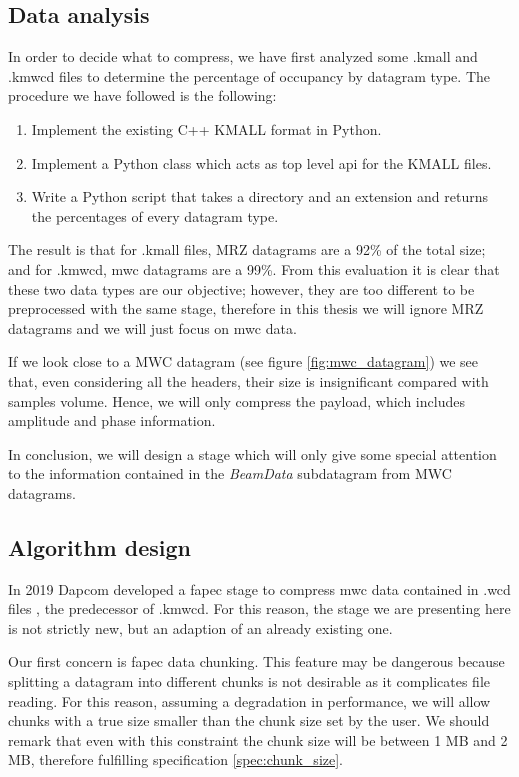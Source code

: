 \subsection{Data analysis}
In order to decide what to compress, we have first analyzed some .kmall and .kmwcd files to determine the percentage of occupancy by datagram type. The procedure we have followed is the following:
\begin{enumerate}
	\item Implement the existing C++ KMALL format in Python.
	\item Implement a Python class which acts as top level \acrshort{api} for the KMALL files.
	\item Write a Python script that takes a directory and an extension and returns the percentages of every datagram type.
\end{enumerate}
The result is that for .kmall files, MRZ datagrams are a 92\% of the total size; and for .kmwcd, \acrshort{mwc} datagrams are a 99\%. From this evaluation it is clear that these two data types are our objective; however, they are too different to be preprocessed with the same stage, therefore in this thesis we will ignore MRZ datagrams and we will just focus on \acrshort{mwc} data.

If we look close to a MWC datagram (see figure \ref{fig:mwc_datagram}) we see that, even considering all the headers, their size is insignificant compared with samples volume. Hence, we will only compress the payload, which includes amplitude and phase information.

In conclusion, we will design a stage which will only give some special attention to the information contained in the \textit{BeamData} subdatagram from MWC datagrams.

\subsection{Algorithm design}
In 2019 Dapcom developed a \acrshort{fapec} stage to compress \acrshort{mwc} data contained in .wcd files \parencite{Portell2019}, the predecessor of .kmwcd. For this reason, the stage we are presenting here is not strictly new, but an adaption of an already existing one.

Our first concern is \acrshort{fapec} data chunking. This feature may be dangerous because splitting a datagram into different chunks is not desirable as it complicates file reading. For this reason, assuming a degradation in performance, we will allow chunks with a true size smaller than the chunk size set by the user. We should remark that even with this constraint the chunk size will be between 1 MB and 2 MB, therefore fulfilling specification \ref{spec:chunk_size}.

